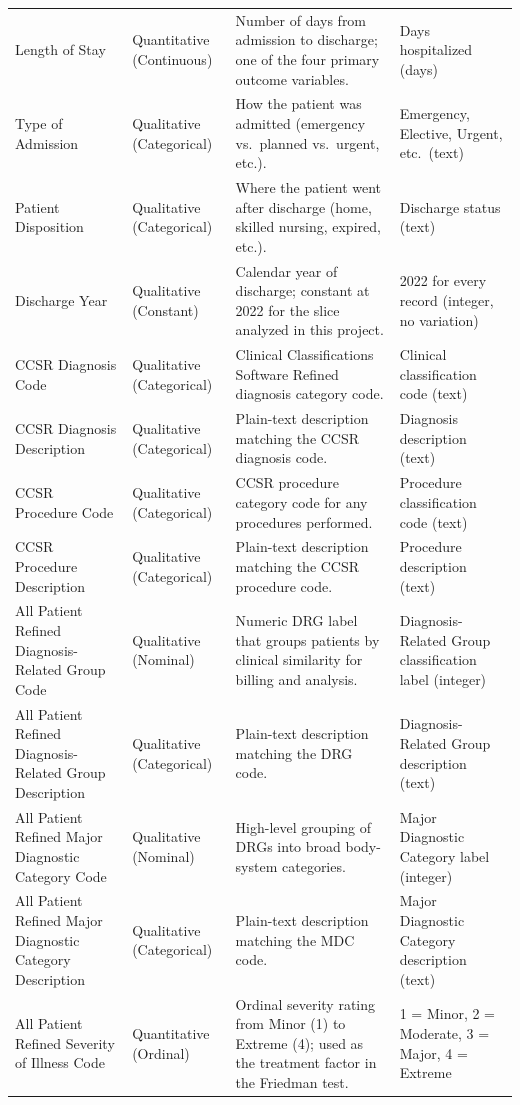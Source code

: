 \documentclass[12pt]{article}
\begin{document}
\begin{longtable}{p{} p{} p{} p{}}
Length of Stay & Quantitative (Continuous) & Number of days from admission to discharge; one of the four primary outcome variables. & Days hospitalized (days) \\
Type of Admission & Qualitative (Categorical) & How the patient was admitted (emergency vs.\ planned vs.\ urgent, etc.). & Emergency, Elective, Urgent, etc.\ (text) \\
Patient Disposition & Qualitative (Categorical) & Where the patient went after discharge (home, skilled nursing, expired, etc.). & Discharge status (text) \\
Discharge Year & Qualitative (Constant) & Calendar year of discharge; constant at 2022 for the slice analyzed in this project. & 2022 for every record (integer, no variation) \\
CCSR Diagnosis Code & Qualitative (Categorical) & Clinical Classifications Software Refined diagnosis category code. & Clinical classification code (text) \\
CCSR Diagnosis Description & Qualitative (Categorical) & Plain-text description matching the CCSR diagnosis code. & Diagnosis description (text) \\
CCSR Procedure Code & Qualitative (Categorical) & CCSR procedure category code for any procedures performed. & Procedure classification code (text) \\
CCSR Procedure Description & Qualitative (Categorical) & Plain-text description matching the CCSR procedure code. & Procedure description (text) \\
All Patient Refined Diagnosis-Related Group Code & Qualitative (Nominal) & Numeric DRG label that groups patients by clinical similarity for billing and analysis. & Diagnosis-Related Group classification label (integer) \\
All Patient Refined Diagnosis-Related Group Description & Qualitative (Categorical) & Plain-text description matching the DRG code. & Diagnosis-Related Group description (text) \\
All Patient Refined Major Diagnostic Category Code & Qualitative (Nominal) & High-level grouping of DRGs into broad body-system categories. & Major Diagnostic Category label (integer) \\
All Patient Refined Major Diagnostic Category Description & Qualitative (Categorical) & Plain-text description matching the MDC code. & Major Diagnostic Category description (text) \\
All Patient Refined Severity of Illness Code & Quantitative (Ordinal) & Ordinal severity rating from Minor (1) to Extreme (4); used as the treatment factor in the Friedman test. & 1 = Minor, 2 = Moderate, 3 = Major, 4 = Extreme \\

\end{longtable}
\end{document}
